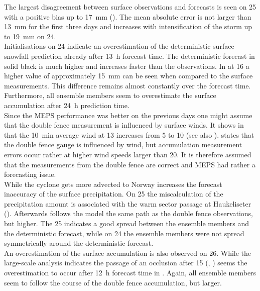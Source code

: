 The largest disagreement between surface observations and forecasts is seen on \SI{25}{\dec} with a positive bias up to \SI{17}{\mm} (). The mean absolute error is not larger than \SI{13}{\mm} for the first three days and increases with intensification of the storm up to \SI{19}{\mm} on \SI{24}{\dec}.
\\
Initialisations on \SI{24}{\dec} indicate an overestimation of the deterministic surface snowfall prediction already after \SI{13}{\hour} forecast time. The deterministic forecast in solid black is much higher and increases faster than the observations. In  at \SI{16}{\UTC} a higher value of approximately \SI{15}{\mm} can be seen when compared to the surface measurements. This difference remains almost constantly over the forecast time. Furthermore, all ensemble members seem to overestimate the surface accumulation after \SI{24}{\hour} prediction time. 
\\
Since the MEPS performance was better on the previous days one might assume that the double fence measurement is influenced by surface winds. It shows in  that the \SI{10}{\minute} average wind at \SI{13}{\UTC} increases from \SI{5}{\mPs} to \SI{10}{\mPs} (see also ). \citet{wolff_wmo_2018} states that the double fence gauge is influenced by wind, but accumulation measurement errors occur rather at higher wind speeds larger than \SI{20}{\mPs}. It is therefore assumed that the measurements from the double fence are correct and MEPS had rather a forecasting issue.
\\
While the cyclone gets more advected to Norway increases the forecast inaccuracy of the surface precipitation. 
On \SI{25}{\dec} the miscalculation of the precipitation amount is associated with the warm sector passage at Haukeliseter (). Afterwards follows the model the same path as the double fence observations, but higher. The \SI{25}{\dec} indicates a good spread between the ensemble members and the deterministic forecast, while on \SI{24}{\dec} the ensemble members were not spread symmetrically around the deterministic forecast. 
\\
An overestimation of the surface accumulation is also observed on \SI{26}{\dec}. While the large-scale analysis indicates the passage of an occlusion after \SI{15}{\UTC} (, ) seems the overestimation to occur after \SI{12}{\hour} forecast time in . Again, all ensemble members seem to follow the course of the double fence accumulation, but larger. 

